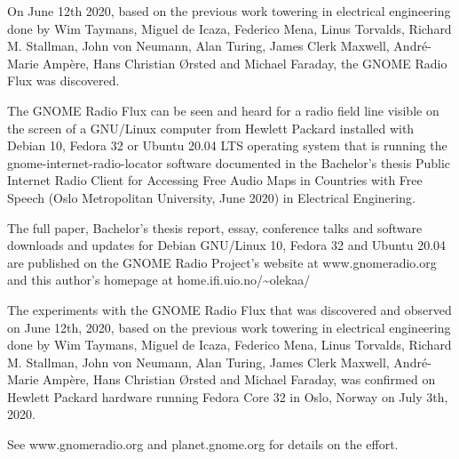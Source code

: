 \documentclass[a4paper]{article}
\begin{document}
On June 12th 2020, based on the previous work towering in 
electrical engineering done by Wim Taymans, Miguel de Icaza, Federico Mena, Linus 
Torvalds, Richard M. Stallman, John von Neumann, Alan Turing, James Clerk 
Maxwell, Andr\'e-Marie Amp\`ere, Hans Christian \O{}rsted and Michael Faraday, the 
GNOME Radio Flux was discovered.

The GNOME Radio Flux can be seen and heard for a radio field line visible on the 
screen of a GNU/Linux computer from Hewlett Packard installed with Debian 10, Fedora 32 or 
Ubuntu 20.04 LTS operating system that is running the 
gnome-internet-radio-locator software documented in the Bachelor's thesis 
Public Internet Radio Client for Accessing Free Audio Maps in Countries 
with Free Speech (Oslo Metropolitan University, June 2020) in Electrical Enginering.

The full paper, Bachelor's thesis report, essay, conference talks and software downloads and updates for Debian GNU/Linux 10, Fedora 32 and Ubuntu 20.04 are published on the GNOME Radio Project's website at www.gnomeradio.org and this author's homepage at home.ifi.uio.no/\textasciitilde{}olekaa/

The experiments with the GNOME Radio Flux that was discovered and
observed on June 12th, 2020, based on the previous work towering in
electrical engineering done by Wim Taymans, Miguel de Icaza, Federico
Mena, Linus Torvalds, Richard M. Stallman, John von Neumann, Alan
Turing, James Clerk Maxwell, Andr\'e-Marie Amp\`ere, Hans Christian
\O{}rsted and Michael Faraday, was confirmed on Hewlett Packard
hardware running Fedora Core 32 in Oslo, Norway on July 3th, 2020.

See www.gnomeradio.org and planet.gnome.org for details on the effort.
\end{document}
